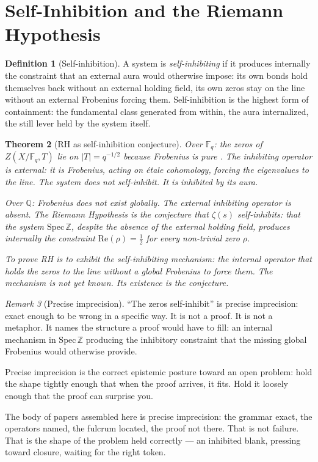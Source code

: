 \documentclass[12pt]{article}
\newtheorem{theorem}{Theorem}
\theoremstyle{definition}
\newtheorem{definition}[theorem]{Definition}
\theoremstyle{remark}
\newtheorem{remark}[theorem]{Remark}
\begin{document}
\section{Self-Inhibition and the Riemann Hypothesis}

\begin{definition}[Self-inhibition]
A system is \emph{self-inhibiting} if it produces internally
the constraint that an external aura would otherwise impose:
its own bonds hold themselves back without an external holding field,
its own zeros stay on the line without an external Frobenius forcing them.
Self-inhibition is the highest form of containment:
the fundamental class generated from within,
the aura internalized,
the still lever held by the system itself.
\end{definition}

\begin{theorem}[RH as self-inhibition conjecture]
\label{thm:rh}
Over $\mathbb{F}_q$: the zeros of $Z(X/\mathbb{F}_q, T)$
lie on $|T| = q^{-1/2}$ because Frobenius is pure \cite{weil}.
The inhibiting operator is external: it is Frobenius,
acting on \'etale cohomology, forcing the eigenvalues to the line.
The system does not self-inhibit. It is inhibited by its aura.

Over $\mathbb{Q}$: Frobenius does not exist globally.
The external inhibiting operator is absent.
The Riemann Hypothesis is the conjecture that
$\zeta(s)$ self-inhibits: that the system
$\mathrm{Spec}\,\mathbb{Z}$, despite the absence of
the external holding field, produces internally
the constraint $\mathrm{Re}(\rho) = \tfrac{1}{2}$
for every non-trivial zero $\rho$.

To prove RH is to exhibit the self-inhibiting mechanism:
the internal operator that holds the zeros to the line
without a global Frobenius to force them.
The mechanism is not yet known.
Its existence is the conjecture.
\end{theorem}

\begin{remark}[Precise imprecision]
``The zeros self-inhibit'' is precise imprecision:
exact enough to be wrong in a specific way.
It is not a proof. It is not a metaphor.
It names the structure a proof would have to fill:
an internal mechanism in $\mathrm{Spec}\,\mathbb{Z}$
producing the inhibitory constraint
that the missing global Frobenius would otherwise provide.

Precise imprecision is the correct epistemic posture
toward an open problem:
hold the shape tightly enough that when the proof arrives,
it fits.
Hold it loosely enough that the proof can surprise you.

The body of papers assembled here \cite{math} is precise imprecision:
the grammar exact, the operators named, the fulcrum located,
the proof not there.
That is not failure. That is the shape of the problem
held correctly --- an inhibited blank,
pressing toward closure,
waiting for the right token.
\end{remark}
\end{document}
